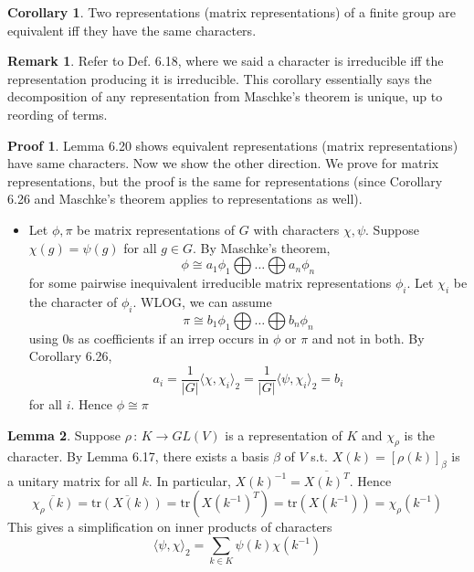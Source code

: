 \documentclass{book}
\newcommand{\inner}[1]{\langle #1 \rangle}
\newcommand{\abs}[1]{\lvert #1 \rvert }
\newcommand{\tr}[1]{\textrm{tr}( #1 )}
\theoremstyle{definition}
\newtheorem{lemma}{Lemma}[chapter]
\newtheorem{corollary}[lemma]{Corollary}
\theoremstyle{remarkstyle}
\newtheorem*{remark}{Remark}%
\newtheorem*{myproof}{Proof}%
\begin{document}
\begin{corollary}
    Two representations (matrix representations) of a finite group are equivalent iff they have the same characters.
\end{corollary}
\begin{remark}
    Refer to Def. 6.18, where we said a character is irreducible iff the representation producing it is irreducible. This corollary essentially says the decomposition of any representation from Maschke's theorem is unique, up to reording of terms.
\end{remark}
\begin{myproof}
    Lemma 6.20 shows equivalent representations (matrix representations) have same characters. Now we show the other direction. We prove for matrix representations, but the proof is the same for representations (since Corollary 6.26 and Maschke's theorem applies to representations as well).
    \begin{itemize}
        \item Let $\phi,\pi$ be matrix representations of $G$ with characters $\chi,\psi$. Suppose $\chi(g)=\psi(g)$ for all $g\in G$. By Maschke's theorem, 
        $$
            \phi \cong a_1\phi_1 \bigoplus \dots \bigoplus a_n\phi_n 
        $$
        for some pairwise inequivalent irreducible matrix representations $\phi_i$. Let $\chi_i$ be the character of $\phi_i$. WLOG, we can assume 
        $$
        \pi \cong b_1\phi_1 \bigoplus \dots \bigoplus b_n\phi_n
        $$
        using 0s as coefficients if an irrep occurs in $\phi$ or $\pi$ and not in both. By Corollary 6.26,
        $$
        a_i = \frac{1}{\abs{G}}\inner{\chi,\chi_i}_2 = \frac{1}{\abs{G}}\inner{\psi,\chi_i}_2 = b_i
        $$
        for all $i$. Hence $\phi\cong\pi$ \newline
    \end{itemize}
\end{myproof}

\begin{lemma}
    Suppose $\rho\,:\,K\rightarrow GL(V)$ is a representation of $K$ and $\chi_\rho$ is the character. By Lemma 6.17, there exists a basis $\beta$ of $V$ s.t. $X(k)=[\rho(k)]_\beta $ is a unitary matrix for all $k$. In particular, $X(k)^{-1}=\overline{X(k)^T} $. Hence
    $$
    \overline{\chi_\rho(k)} = \overline{\tr{X(k)}} = \tr{X(k^{-1})^T} = \tr{X(k^{-1})} = \chi_\rho(k^{-1})
    $$
    This gives a simplification on inner products of characters 
    $$
    \inner{\psi,\chi}_2 = \sum_{k\in K}\psi(k)\chi(k^{-1})
    $$
    \newline
\end{lemma}
\end{document}
